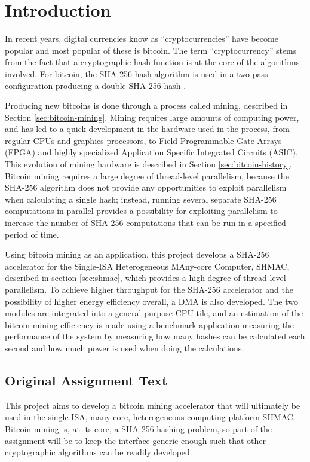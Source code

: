 \chapter{Introduction}

In recent years, digital currencies know as ``cryptocurrencies'' have become popular
and most popular of these is bitcoin. The term ``cryptocurrency'' stems from the fact
that a cryptographic hash function is at the core of the algorithms involved. For bitcoin,
the SHA-256 hash algorithm is used in a two-pass configuration producing a double SHA-256
hash \cite{bitcoin}.

Producing new bitcoins is done through a process called mining, described in Section \ref{sec:bitcoin-mining}.
Mining requires large amounts of computing power, and has led to a quick development in
the hardware used in the process, from regular CPUs and graphics processors, to Field-Programmable Gate Arrays (FPGA) and highly specialized Application Specific
Integrated Circuits (ASIC). This evolution of mining hardware is described in Section \ref{sec:bitcoin-history}.
Bitcoin mining requires a large degree of thread-level parallelism, because the SHA-256
algorithm does not provide any opportunities to exploit parallelism when calculating a single hash;
instead, running several separate SHA-256 computations in parallel provides a possibility for
exploiting parallelism to increase the number of SHA-256 computations that can be run in a specified period of time.

Using bitcoin mining as an application, this project develops a SHA-256 accelerator
for the Single-ISA Heterogeneous MAny-core Computer, SHMAC, described in section \ref{sec:shmac},
which provides a high degree of thread-level parallelism. To achieve higher throughput for the
SHA-256 accelerator and the possibility of higher energy efficiency overall, a DMA is also
developed. The two modules are integrated into a general-purpose CPU tile, and an estimation
of the bitcoin mining efficiency is made using a benchmark application measuring the performance
of the system by measuring how many hashes can be calculated each second and how much power
is used when doing the calculations.

\section{Original Assignment Text}

This project aims to develop a bitcoin mining accelerator that will ultimately be
used in the single-ISA, many-core, heterogeneous computing platform SHMAC. Bitcoin
mining is, at its core, a SHA-256 hashing problem, so part of the assignment will
be to keep the interface generic enough such that other cryptographic algorithms
can be readily developed.

